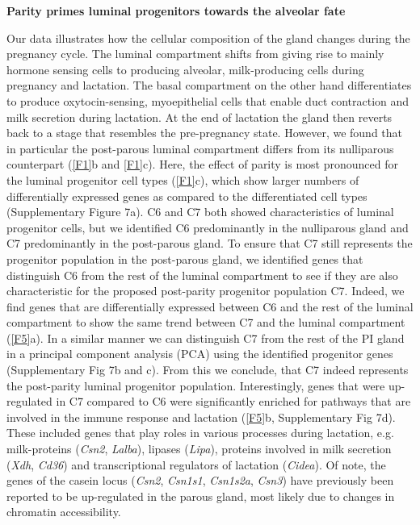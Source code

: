 \documentclass[titlepage, 12pt, oneside]{amsart}
\begin{document}
\textbf{Parity primes luminal progenitors towards the alveolar fate}

Our data illustrates how the cellular composition of the gland changes during the pregnancy cycle.
The luminal compartment shifts from giving rise to mainly hormone sensing cells to producing alveolar, milk-producing cells during pregnancy and lactation. 
The basal compartment on the other hand differentiates to produce oxytocin-sensing, myoepithelial cells that enable duct contraction and milk secretion during lactation.
At the end of lactation the gland then reverts back to a stage that resembles the pre-pregnancy state.
However, we found that in particular the post-parous luminal compartment differs from its nulliparous counterpart (\autoref{F1}b and \autoref{F1}c).
Here, the effect of parity is most pronounced for the luminal progenitor cell types (\autoref{F1}c), which show larger numbers of differentially expressed genes as compared to the differentiated cell types (Supplementary Figure 7a).
C6 and C7 both showed characteristics of luminal progenitor cells, but we identified C6 predominantly in the nulliparous gland and C7 predominantly in the post-parous gland.
To ensure that C7 still represents the progenitor population in the post-parous gland, we identified genes that distinguish C6 from the rest of the luminal compartment to see if they are also characteristic for the proposed post-parity progenitor population C7.
Indeed, we find genes that are differentially expressed between C6 and the rest of the luminal compartment to show the same trend between C7 and the luminal compartment (\autoref{F5}a).
In a similar manner we can distinguish C7 from the rest of the PI gland in a principal component analysis (PCA) using the identified progenitor genes (Supplementary Fig 7b and c).
From this we conclude, that C7 indeed represents the post-parity luminal progenitor population.
Interestingly, genes that were up-regulated in C7 compared to C6 were significantly enriched for pathways that are involved in the immune response and lactation (\autoref{F5}b, Supplementary Fig 7d).
These included genes that play roles in various processes during lactation, e.g. milk-proteins (\textit{Csn2}, \textit{Lalba}), lipases (\textit{Lipa}), proteins involved in milk secretion (\textit{Xdh}, \textit{Cd36}) and transcriptional regulators of lactation (\textit{Cidea})\autocite{Wang2012}.
Of note, the genes of the casein locus (\textit{Csn2}, \textit{Csn1s1}, \textit{Csn1s2a}, \textit{Csn3}) have previously been reported to be up-regulated in the parous gland, most likely due to changes in chromatin accessibility\autocite{Dos2015,Rijnkels2013}.
\end{document}
